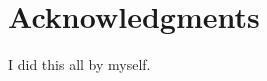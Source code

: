 \documentclass[conference]{IEEEtran}
\begin{document}

\section*{Acknowledgments}

I did this all by myself.









\end{document}
